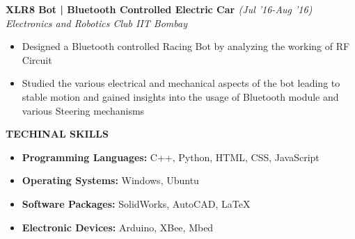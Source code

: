\documentclass[11pt]{article}%
\begin{document}
\vspace{-0.4cm}








{\flushleft \bf \large{XLR8 Bot | Bluetooth Controlled Electric Car }} \hfill {{{\em{(Jul '16-Aug '16)}}}} \\
{\em{Electronics and Robotics Club \textbar IIT Bombay \hfill {{}}}}
\vspace{-1mm}
\begin{itemize}
\vspace{-0.1cm}
\setlength\itemsep{0.01em}
\item Designed a Bluetooth controlled Racing Bot by analyzing the working of RF Circuit
\item Studied the various electrical and mechanical aspects of the bot leading to stable motion and gained insights into the usage of Bluetooth module and various Steering mechanisms
\end{itemize}
\vspace{-3mm}

























































\begin{flushleft}
\bf{\LARGE{T}\Large{ECHINAL} \LARGE{S}\Large{KILLS}}
\end{flushleft}
\vspace{-2mm}
\hline

\begin{itemize}
    \setlength\itemsep{0.01em}
    \item \textbf{Programming Languages:} C++, Python, HTML, CSS, JavaScript
    \item \textbf{Operating Systems:} Windows, Ubuntu
    \item \textbf{Software Packages:}  SolidWorks, AutoCAD, \LaTeX 
    \item \textbf{Electronic Devices:} Arduino, XBee, Mbed
\end{itemize}
\end{document}
